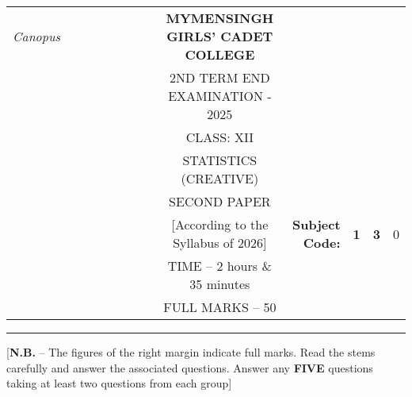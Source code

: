 \documentclass[12pt]{article}
\begin{document}
\begin{table}[]
\begin{tabular}{llllllllcllcl}
\textit{Canopus} &  &  &  &  &  &  &  & \textbf{MYMENSINGH GIRLS’ CADET COLLEGE} &                                             &                                 & \multicolumn{1}{l}{}            &                        \\
                 &  &  &  &  &  &  &  & 2ND TERM END EXAMINATION - 2025          &                                             &                                 &                                 &                        \\
                 &  &  &  &  &  &  &  & CLASS: XII                               &                                             &                                 &                                 &                        \\
                 &  &  &  &  &  &  &  & STATISTICS (CREATIVE)                    &                                             &                                 &                                 &                        \\
                 &  &  &  &  &  &  &  & SECOND PAPER                             &                                             &                                 & \multicolumn{1}{r}{}            &                        \\ \cline{11-13} 
                 &  &  &  &  &  &  &  & [According to the Syllabus of 2026]      & \multicolumn{1}{r|}{\textbf{Subject Code:}} & \multicolumn{1}{l|}{\textbf{1}} & \multicolumn{1}{l|}{\textbf{3}} & \multicolumn{1}{l|}{0} \\ \cline{11-13} 
                 &  &  &  &  &  &  &  & TIME – 2 hours \& 35 minutes             &                                             &                                 & \multicolumn{1}{r}{}            &                        \\
                 &  &  &  &  &  &  &  & FULL MARKS – 50                          &                                             &                                 & \multicolumn{1}{r}{\textbf{}}   &                       
\end{tabular}
\end{table}


\hrule

\begin{center}
[\textbf{N.B.} – The figures of the right margin indicate full marks. Read the stems carefully and answer the associated questions. Answer any \textbf{FIVE} questions taking at least two questions from each group]\\
\end{center}
\end{document}
